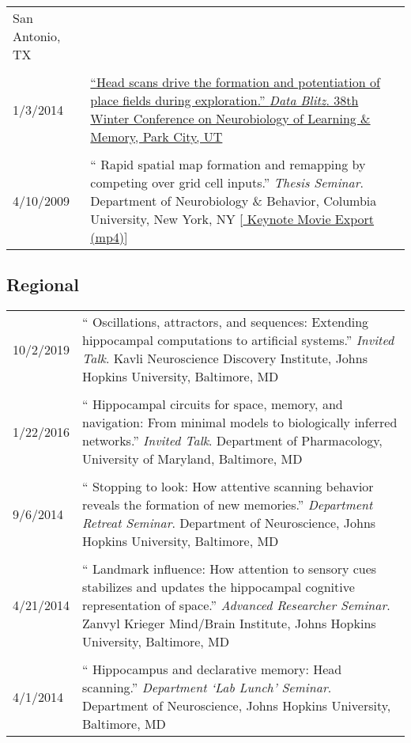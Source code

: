 \documentclass[10pt]{article}
\newcommand{\itemtitle}[1]{{\color{hopkinsblue}\ul{#1}}}
\newcommand{\unpubtitle}[1]{{\color{hopkinsblue} #1}}
\begin{document}
\begin{longtable}{@{\hspace{0.2in}}l>{\raggedright\arraybackslash}p{}}
  San Antonio, TX \\
  \tabularnewline
  1/3/2014 & \href{https://jdmonaco.com/files/ScanningSlide.pdf}
  {``\itemtitle{Head scans drive the formation and potentiation of place
  fields during exploration}.'' \emph{Data Blitz}. 38th Winter Conference on
  Neurobiology of Learning \& Memory, Park City, UT} \\
  \tabularnewline
  4/10/2009 & ``\unpubtitle{Rapid spatial map formation and remapping by
  competing over grid cell inputs}.'' \emph{Thesis Seminar}. Department of
  Neurobiology \& Behavior, Columbia University, New York, NY 
  [\href{https://jdmonaco.com/files/monaco-2009-thesis-seminar-Keynote.mp4}
  {\unpubtitle{Keynote Movie Export (mp4)}}] \\
\end{longtable}

\smallskip
\subsection*{Regional}

\begin{longtable}{@{\hspace{0.2in}}l>{\raggedright\arraybackslash}p{}}
  10/2/2019 \hspace{0.1in} & ``\unpubtitle{Oscillations, attractors, and
  sequences: Extending hippocampal computations to artificial systems}.''
  \emph{Invited Talk}. Kavli Neuroscience Discovery Institute, Johns Hopkins
  University, Baltimore, MD\\
  \tabularnewline
  1/22/2016 & ``\unpubtitle{Hippocampal circuits for space, memory, and
  navigation: From minimal models to biologically inferred networks}.''
  \emph{Invited Talk}. Department of Pharmacology, University of Maryland,
  Baltimore, MD\\
  \tabularnewline
  9/6/2014 & ``\unpubtitle{Stopping to look: How attentive scanning behavior
  reveals the formation of new memories}.'' \emph{Department Retreat Seminar}.
  Department of Neuroscience, Johns Hopkins University, Baltimore, MD\\
  \tabularnewline
  4/21/2014 & ``\unpubtitle{Landmark influence: How attention to sensory cues
  stabilizes and updates the hippocampal cognitive representation of space}.''
  \emph{Advanced Researcher Seminar}. Zanvyl Krieger Mind/Brain Institute, Johns
  Hopkins University, Baltimore, MD\\
  \tabularnewline
  4/1/2014 & ``\unpubtitle{Hippocampus and declarative memory:
  Head scanning}.'' \emph{Department `Lab Lunch' Seminar}. Department of
  Neuroscience, Johns Hopkins University, Baltimore, MD\\
\end{longtable}
\end{document}
